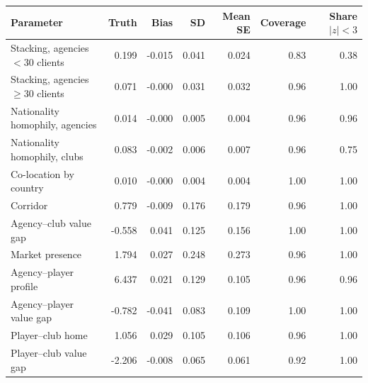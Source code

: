 \begin{tabular}{lrrrrrr}\hline
Parameter & Truth & Bias & SD & Mean SE & Coverage & Share $|z|<3$ \\ \hline
Stacking, agencies $<30$ clients & 0.199 & -0.015 & 0.041 & 0.024 & 0.83 & 0.38 \\
Stacking, agencies $\ge30$ clients & 0.071 & -0.000 & 0.031 & 0.032 & 0.96 & 1.00 \\
Nationality homophily, agencies & 0.014 & -0.000 & 0.005 & 0.004 & 0.96 & 0.96 \\
Nationality homophily, clubs & 0.083 & -0.002 & 0.006 & 0.007 & 0.96 & 0.75 \\
Co-location by country & 0.010 & -0.000 & 0.004 & 0.004 & 1.00 & 1.00 \\
Corridor & 0.779 & -0.009 & 0.176 & 0.179 & 0.96 & 1.00 \\
Agency--club value gap & -0.558 & 0.041 & 0.125 & 0.156 & 1.00 & 1.00 \\
Market presence & 1.794 & 0.027 & 0.248 & 0.273 & 0.96 & 1.00 \\
Agency--player profile & 6.437 & 0.021 & 0.129 & 0.105 & 0.96 & 0.96 \\
Agency--player value gap & -0.782 & -0.041 & 0.083 & 0.109 & 1.00 & 1.00 \\
Player--club home & 1.056 & 0.029 & 0.105 & 0.106 & 0.96 & 1.00 \\
Player--club value gap & -2.206 & -0.008 & 0.065 & 0.061 & 0.92 & 1.00 \\
\hline\end{tabular}
